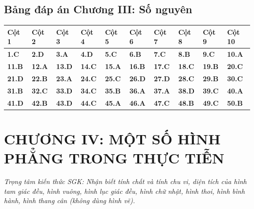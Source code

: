 \documentclass[11pt,a4paper]{article}
\begin{document}
\subsection*{\color{primary} Bảng đáp án Chương III: Số nguyên}
\begin{center}
\renewcommand{\arraystretch}{1.25}
\begin{tabularx}{\textwidth}{*{10}{>{\centering\arraybackslash}X}}
\toprule
\textbf{\color{primary} Cột 1} & \textbf{\color{primary} Cột 2} & \textbf{\color{primary} Cột 3} & \textbf{\color{primary} Cột 4} & \textbf{\color{primary} Cột 5} & \textbf{\color{primary} Cột 6} & \textbf{\color{primary} Cột 7} & \textbf{\color{primary} Cột 8} & \textbf{\color{primary} Cột 9} & \textbf{\color{primary} Cột 10} \\
\midrule
\textbf{1.C} & \textbf{2.D} & \textbf{3.A} & \textbf{4.D} & \textbf{5.C} & \textbf{6.B} & \textbf{7.C} & \textbf{8.B} & \textbf{9.C} & \textbf{10.A} \\
\rowcolor{rowtint} \textbf{11.B} & \textbf{12.A} & \textbf{13.D} & \textbf{14.C} & \textbf{15.A} & \textbf{16.B} & \textbf{17.C} & \textbf{18.C} & \textbf{19.B} & \textbf{20.C} \\
\textbf{21.D} & \textbf{22.B} & \textbf{23.A} & \textbf{24.C} & \textbf{25.C} & \textbf{26.D} & \textbf{27.D} & \textbf{28.C} & \textbf{29.B} & \textbf{30.C} \\
\rowcolor{rowtint} \textbf{31.B} & \textbf{32.C} & \textbf{33.D} & \textbf{34.C} & \textbf{35.B} & \textbf{36.A} & \textbf{37.A} & \textbf{38.D} & \textbf{39.C} & \textbf{40.A} \\
\textbf{41.D} & \textbf{42.B} & \textbf{43.D} & \textbf{44.C} & \textbf{45.A} & \textbf{46.A} & \textbf{47.C} & \textbf{48.B} & \textbf{49.C} & \textbf{50.B} \\
\bottomrule
\end{tabularx}
\end{center}\vspace{10pt}
\section*{\color{primary} CHƯƠNG IV: MỘT SỐ HÌNH PHẲNG TRONG THỰC TIỄN}
\textit{Trọng tâm kiến thức SGK: Nhận biết tính chất và tính chu vi, diện tích của hình tam giác đều, hình vuông, hình lục giác đều, hình chữ nhật, hình thoi, hình bình hành, hình thang cân (không dùng hình vẽ).}\par\vspace{4pt}
\end{document}
